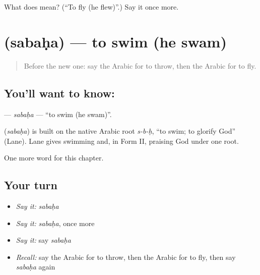 \begin{tcolorbox}[breakable,colback=teal!4,colframe=teal!35!black,title={Before you move on}]
What does  mean? (\textquotedblleft{}To fly (he flew)\textquotedblright{}.) Say it once more.
\end{tcolorbox}
\section[\texorpdfstring{\ar{سبح} (sabaḥa)}{سبح (sabaḥa)}]{ (sabaḥa) — to swim (he swam)}

\label{lesson:AR-C63-sabaha}



\begin{quote}
Before the new one: say the Arabic for to throw, then the Arabic for to fly.
\end{quote}

\subsection*{You'll want to know: }
\textbf{} — \emph{sabaḥa} — \textquotedblleft{}to swim (he swam)\textquotedblright{}.

\begin{cousinweb}
\textbf{} (\emph{sabaḥa}) is built on the native Arabic root \emph{s-b-ḥ}, \textquotedblleft{}to swim; to glorify God\textquotedblright{} (Lane). Lane gives swimming and, in Form II, praising God under one root.
\end{cousinweb}

\begin{grammarlens}[title={What you've built}]
One more word for this chapter.
\end{grammarlens}

\subsection*{Your turn}
\begin{itemize}
\raggedright
  \item \emph{Say it:} \emph{sabaḥa}
  \item \emph{Say it:} \emph{sabaḥa}, once more
  \item \emph{Say it:} say \emph{sabaḥa}
  \item \emph{Recall:} say the Arabic for to throw, then the Arabic for to fly, then say \emph{sabaḥa} again
\end{itemize}

